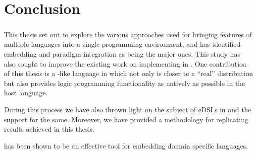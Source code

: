 \documentclass[thesis-solanki.tex]{subfiles}
\begin{document}
\chapter{Conclusion}\label{chap:conclusion}
\paragraph{}
This thesis set out to explore the various approaches used for bringing features of multiple languages into a single 
programming environment, and has identified embedding and paradigm integration as being the major ones. This study has also sought to improve
the existing work on implementing  in . One contribution of this thesis is a  
-like language in  which not only is closer to a ``real''  distribution but also provides 
logic programming functionality as natively as possible in the host language.

During this process we have also thrown light on the subject of eDSLs in  and the support for the same. Moreover, we
have provided a methodology for replicating results achieved in this thesis.

 has been shown to be an effective tool for embedding domain specific languages.


\ifMain
\begin{scope}
  \nolinenumbers
  \enotesize
  \par
  \begin{singlespace}
  \setlength{\parskip}{12pt plus 2pt minus 1pt}
  \theendnotes
  \par
  \end{singlespace}
\end{scope}
\fi
\end{document}
